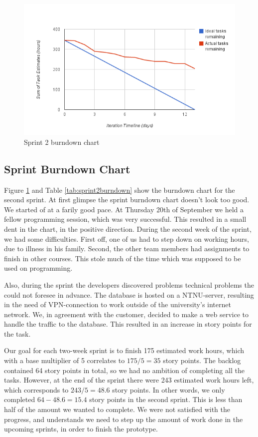 \begin{figure}[t]
	\begin{center}
		\includegraphics[width=15cm]{Pictures/Charts/Sprint2burndown}
	\end{center}
	\caption{Sprint 2 burndown chart}
	\label{fig:sprint2burndown}
\end{figure}

\subsection{Sprint Burndown Chart}
Figure \ref{fig:sprint2burndown} and Table \ref{tab:sprint2burndown} show the burndown chart for the second sprint. At first glimpse the sprint burndown chart doesn't look too good. We started of at a farily good pace. 
At Thursday 20th of September we held a fellow programming session, which was very successful. This resulted 
in a small dent in the chart, in the positive direction. During the second week of the sprint, we had 
some difficulties. First off, one of us had to step down on working hours, due to illness in his 
family. Second, the other team members had assignments to finish in other courses. This stole much of the 
time which was supposed to be used on programming.

Also, during the sprint the developers discovered problems technical problems the could not foresee in advance. 
The database is hosted on a NTNU-server, resulting in the need of VPN-connection to work outside of the university's 
internet network. We, in agreement with the customer, decided to make a web service to handle the traffic 
to the database. This resulted in an increase in story points for the task.

Our goal for each two-week sprint is to finish 175 estimated work hours, which with a base multiplier of 5 correlates to
$175/5=35$ story points. The backlog contained 64 story points in total, so we had no ambition of completing all the tasks.
However, at the end of the sprint there were 243 estimated work hours left, which corresponds to $243/5=48.6$ story points.
In other words, we only completed $64-48.6=15.4$ story points in the second sprint. This is less than half of the amount we
wanted to complete. We were not satisfied with the progress, and understands we need to step up the amount of work done in 
the upcoming sprints, in order to finish the prototype.
\clearpage{}
\blankpage{}